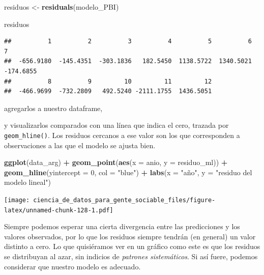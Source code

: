 \documentclass[spanish,]{book}
\newenvironment{Shaded}{\begin{snugshade}}{\end{snugshade}}
\newcommand{\DataTypeTok}[1]{\textcolor[rgb]{0.13,0.29,0.53}{#1}}
\newcommand{\DecValTok}[1]{\textcolor[rgb]{0.00,0.00,0.81}{#1}}
\newcommand{\KeywordTok}[1]{\textcolor[rgb]{0.13,0.29,0.53}{\textbf{#1}}}
\newcommand{\NormalTok}[1]{#1}
\newcommand{\OperatorTok}[1]{\textcolor[rgb]{0.81,0.36,0.00}{\textbf{#1}}}
\newcommand{\StringTok}[1]{\textcolor[rgb]{0.31,0.60,0.02}{#1}}
\begin{document}
\begin{Shaded}
\begin{Highlighting}[]
\NormalTok{residuos <-}\StringTok{ }\KeywordTok{residuals}\NormalTok{(modelo_PBI)}

\NormalTok{residuos}
\end{Highlighting}
\end{Shaded}

\begin{verbatim}
##          1          2          3          4          5          6          7 
##  -656.9180  -145.4351  -303.1836   182.5450  1138.5722  1340.5021  -174.6855 
##          8          9         10         11         12 
##  -466.9699  -732.2809   492.5240 -2111.1755  1436.5051
\end{verbatim}

agregarlos a nuestro dataframe,

\begin{Shaded}
\end{Shaded}

y visualizarlos comparados con una línea que indica el cero, trazada por \texttt{geom\_hline()}. Los residuos cercanos a ese valor son los que corresponden a observaciones a las que el modelo se ajusta bien.

\begin{Shaded}
\begin{Highlighting}[]
\KeywordTok{ggplot}\NormalTok{(data_arg) }\OperatorTok{+}
\StringTok{    }\KeywordTok{geom_point}\NormalTok{(}\KeywordTok{aes}\NormalTok{(}\DataTypeTok{x =}\NormalTok{ anio, }\DataTypeTok{y =}\NormalTok{ residuo_ml)) }\OperatorTok{+}
\StringTok{    }\KeywordTok{geom_hline}\NormalTok{(}\DataTypeTok{yintercept =} \DecValTok{0}\NormalTok{, }\DataTypeTok{col =} \StringTok{"blue"}\NormalTok{) }\OperatorTok{+}
\StringTok{    }\KeywordTok{labs}\NormalTok{(}\DataTypeTok{x =} \StringTok{"año"}\NormalTok{, }\DataTypeTok{y =} \StringTok{"residuo del modelo lineal"}\NormalTok{)}
\end{Highlighting}
\end{Shaded}

\texttt{[image: ciencia\_de\_datos\_para\_gente\_sociable\_files/figure-latex/unnamed-chunk-128-1.pdf]}

Siempre podemos esperar una cierta divergencia entre las predicciones y los valores observados, por lo que los residuos siempre tendrán (en general) un valor distinto a cero. Lo que quisiéramos ver en un gráfico como este es que los residuos se distribuyan al azar, sin indicios de \emph{patrones sistemáticos}. Si así fuere, podemos considerar que nuestro modelo es adecuado.
\end{document}
